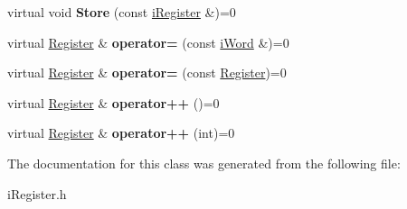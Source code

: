 \begin{DoxyCompactItemize}
\item 
\hypertarget{classiRegister_a9e9c35a78c9eb3cd9eb7fc6f6a146275}{
virtual void {\bfseries Store} (const \hyperlink{classiRegister}{iRegister} \&)=0}
\label{classiRegister_a9e9c35a78c9eb3cd9eb7fc6f6a146275}

\item 
\hypertarget{classiRegister_ad7bc23dcba3e95bf6f17b9d3765e5678}{
virtual \hyperlink{classRegister}{Register} \& {\bfseries operator=} (const \hyperlink{classiWord}{iWord} \&)=0}
\label{classiRegister_ad7bc23dcba3e95bf6f17b9d3765e5678}

\item 
\hypertarget{classiRegister_a448b66675efbeae42616237af577ccfb}{
virtual \hyperlink{classRegister}{Register} \& {\bfseries operator=} (const \hyperlink{classRegister}{Register})=0}
\label{classiRegister_a448b66675efbeae42616237af577ccfb}

\item 
\hypertarget{classiRegister_abca2bcea556d63fb4e3504df221cdc62}{
virtual \hyperlink{classRegister}{Register} \& {\bfseries operator++} ()=0}
\label{classiRegister_abca2bcea556d63fb4e3504df221cdc62}

\item 
\hypertarget{classiRegister_a36e6e1bfbc6a9fe203e8fb5b9f6396cb}{
virtual \hyperlink{classRegister}{Register} \& {\bfseries operator++} (int)=0}
\label{classiRegister_a36e6e1bfbc6a9fe203e8fb5b9f6396cb}

\end{DoxyCompactItemize}


The documentation for this class was generated from the following file:\begin{DoxyCompactItemize}
\item 
iRegister.h\end{DoxyCompactItemize}
